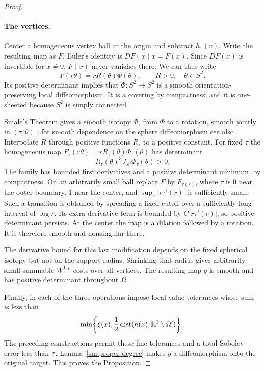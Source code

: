\begin{proof}
\paragraph{The vertices.}
Center a homogeneous vertex ball at the origin and subtract
$h_1(v)$.  Write the resulting map as $F$.  Euler's identity is
$DF(x)x=F(x)$.  Since $DF(x)$ is invertible for $x\ne0$, $F(x)$
never vanishes there.  We can thus write
\begin{equation}
 \label{sm:vertex-form}
 F(r\theta)=rR(\theta)\Phi(\theta),\qquad
 R>0,\quad\theta\in S^2.
\end{equation}
Its positive determinant implies that $\Phi:S^2\to S^2$ is a
smooth orientation-preserving local diffeomorphism.  It is a
covering by compactness, and it is one-sheeted because $S^2$ is
simply connected.

Smale's Theorem gives a smooth isotopy $\Phi_\tau$ from $\Phi$
to a rotation, smooth jointly in $(\tau,\theta)$
\cite[Theorem~6]{Smale1959}; for smooth dependence on the sphere
diffeomorphism see also
\cite[Theorem~1.5]{LiWatts2011}.  Interpolate $R$ through positive
functions $R_\tau$ to a positive constant.  For fixed $\tau$ the
homogeneous map
$F_\tau(r\theta)=rR_\tau(\theta)\Phi_\tau(\theta)$
has determinant
\[
 R_\tau(\theta)^3 J_{S^2}\Phi_\tau(\theta)>0.
\]
The family has bounded first derivatives and a positive
determinant minimum, by compactness.  On an arbitrarily small
ball replace $F$ by $F_{\tau(r)}$, where $\tau$ is 0 near the
outer boundary, 1 near the center, and
$\sup_r|r\tau'(r)|$ is sufficiently small.  Such a transition
is obtained by spreading a fixed cutoff over a sufficiently
long interval of $\log r$.  Its extra derivative term is
bounded by $C|r\tau'(r)|$, so positive determinant persists.
At the center the map is a dilation followed by a rotation.
It is therefore smooth and nonsingular there.

The derivative bound for this last modification depends on the
fixed spherical isotopy but not on the support radius.  Shrinking
that radius gives arbitrarily small summable $W^{1,p}$ costs
over all vertices.  The resulting map $g$ is smooth and has
positive determinant throughout $\Omega$.

Finally, in each of the three operations impose local value
tolerances whose sum is less than
\[
 \min\!\left\{\xi(x),\frac12
 \operatorname{dist}(h(x),\mathbb R^3\setminus\Omega')\right\}.
\]
The preceding constructions permit these fine tolerances and a
total Sobolev error less than $\varepsilon$.  Lemma~\ref{sm:proper-degree}
makes $g$ a diffeomorphism onto the original target.  This proves
the Proposition.
\end{proof}

